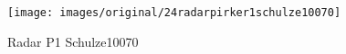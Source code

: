 \begin{figure}[!h] 
\centering 
\texttt{[image: images/original/24radarpirker1schulze10070]}
\caption{Radar P1 Schulze10070}
\label{fig:24radarpirker1schulze10070} 
\end{figure}

